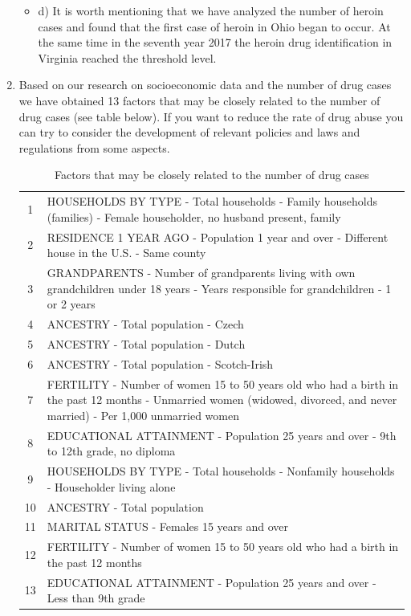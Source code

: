 \documentclass{mcmthesis}
\begin{document}
\begin{enumerate}
\begin{itemize}
  \item d)	
It is worth mentioning that we have analyzed the number of heroin cases and found that the first case of heroin in Ohio began to occur. At the same time in the seventh year 2017 the heroin drug identification in Virginia reached the threshold level.
\end{itemize}

  \item 
Based on our research on socioeconomic data and the number of drug cases we have obtained 13 factors that may be closely related to the number of drug cases (see table below).  If you want to reduce the rate of drug abuse you can try to consider the development of relevant policies and laws and regulations from some aspects.
\begin{table}[htbp]
  \centering
  \caption{Factors that may be closely related to the number of drug cases}
  \small
    \begin{tabularx}{\textwidth}{c|X}
    \toprule
    1&HOUSEHOLDS BY TYPE - Total households - Family households (families) - Female householder, no husband present, family \\
    2&RESIDENCE 1 YEAR AGO - Population 1 year and over - Different house in the U.S. - Same county \\
    3&GRANDPARENTS - Number of grandparents living with own grandchildren under 18 years - Years responsible for grandchildren - 1 or 2 years \\
    4&ANCESTRY - Total population - Czech \\
    5&ANCESTRY - Total population - Dutch \\
    6&ANCESTRY - Total population - Scotch-Irish \\
    7&FERTILITY - Number of women 15 to 50 years old who had a birth in the past 12 months - Unmarried women (widowed, divorced, and never married) - Per 1,000 unmarried women \\
    8&EDUCATIONAL ATTAINMENT - Population 25 years and over - 9th to 12th grade, no diploma \\
    9&HOUSEHOLDS BY TYPE - Total households - Nonfamily households - Householder living alone \\
    10&ANCESTRY - Total population \\
    11&MARITAL STATUS - Females 15 years and over \\
    12&FERTILITY - Number of women 15 to 50 years old who had a birth in the past 12 months \\
    13&EDUCATIONAL ATTAINMENT - Population 25 years and over - Less than 9th grade \\
    \bottomrule
    \end{tabularx}%
  \label{tab:addlabel}%
\end{table}%




\end{enumerate}
\end{document}
